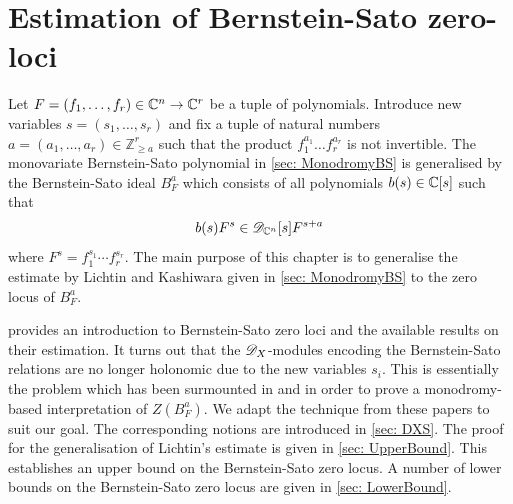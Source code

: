 \chapter{Estimation of Bernstein-Sato zero-loci}\label{ch: ChapterRelHol}
Let $F = (f_1,\ldots,f_r)\in \mathbb{C}^n\to \mathbb{C}^r$ be a tuple of polynomials.
Introduce new variables $s = (s_1,\ldots, s_r)$ and fix a tuple of natural numbers $a = (a_1,\ldots, a_r) \in \mathbb{Z}_{\geq a}^r$ such that the product $f_1^{a_1}\ldots f_r^{a_r}$ is not invertible.
The monovariate Bernstein-Sato polynomial in \cref{sec: MonodromyBS} is generalised by the Bernstein-Sato ideal $B_F^{a}$ which consists of all polynomials $b(s)\in \mathbb{C}[s]$ such that
$$b(s) F^s \in \mathscr{D}_{\mathbb{C}^n}[s]F^{s+a}$$
where $F^s = f_1^{s_1}\cdots f_r^{s_r}$.
The main purpose of this chapter is to generalise the estimate by Lichtin and Kashiwara given in \cref{sec: MonodromyBS} to the zero locus of $B_F^a$.

 provides an introduction to Bernstein-Sato zero loci and the available results on their estimation.
It turns out that the $\mathscr{D}_X$-modules encoding the Bernstein-Sato relations are no longer holonomic due to the new variables $s_i$.
This is essentially the problem which has been surmounted in \cite{budur2020zeroI} and \cite{budur2020zeroII} in order to prove a monodromy-based interpretation of $Z(B_F^a)$.
We adapt the technique from these papers to suit our goal.
The corresponding notions are introduced in \cref{sec: DXS}.
The proof for the generalisation of Lichtin's estimate is given in \cref{sec: UpperBound}.
This establishes an upper bound on the Bernstein-Sato zero locus.
A number of lower bounds on the Bernstein-Sato zero locus are given in \cref{sec: LowerBound}.
